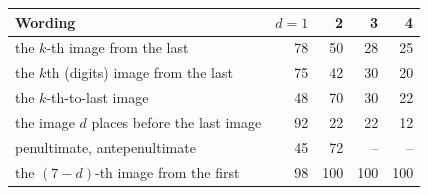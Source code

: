 \begin{tabular}{lrrrr}
\toprule
Wording & $d=1$ & 2 & 3 & 4 \\
\midrule
the $k$-th image from the last & 78 & 50 & 28 & 25 \\
the $k$th (digits) image from the last & 75 & 42 & 30 & 20 \\
the $k$-th-to-last image & 48 & 70 & 30 & 22 \\
the image $d$ places before the last image & 92 & 22 & 22 & 12 \\
penultimate, antepenultimate & 45 & 72 & -- & -- \\
the $(7-d)$-th image from the first & 98 & 100 & 100 & 100 \\
\bottomrule
\end{tabular}
